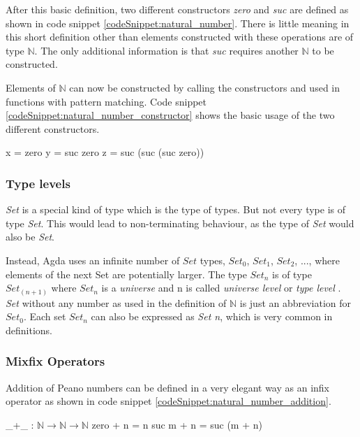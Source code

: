 After this basic definition, two different constructors \emph{zero} and \emph{suc} are defined as shown in code snippet \ref{codeSnippet:natural_number}.
There is little meaning in this short definition other than elements constructed with these operations are of type $\mathbb{N}$.
The only additional information is that \emph{suc} requires another $\mathbb{N}$ to be constructed.

Elements of $\mathbb{N}$ can now be constructed by calling the constructors and used in functions with pattern matching. 
Code snippet \ref{codeSnippet:natural_number_constructor} shows the basic usage of the two different constructors.

\begin{codesnippet}[mathescape=true, caption={Creating Peano numbers}, label={codeSnippet:natural_number_constructor}]
x = zero
y = suc zero
z = suc (suc (suc zero))
\end{codesnippet}

\subsubsection{Type levels}
\emph{Set} is a special kind of type which is the type of types.
But not every type is of type \emph{Set}. 
This would lead to non-terminating behaviour, as the type of \emph{Set} would also be \emph{Set}.

Instead, Agda uses an infinite number of $Set$ types, $Set_0$, $Set_1$, $Set_2$, ..., where elements of the next Set are potentially larger.
The type $Set_n$ is of type $Set_{(n+1)}$ where $Set_n$ is a \emph{universe} and n is called \emph{universe level} or \emph{type level} \cite{AgdaReadTheDocs, 10.1145/2841316}.
\emph{Set} without any number as used in the definition of $\mathbb{N}$ is just an abbreviation for $Set_0$. 
Each set $Set_n$ can also be expressed as \emph{Set n}, which is very common in definitions.

\subsubsection{Mixfix Operators}
Addition of Peano numbers can be defined in a very elegant way as an infix operator as shown in code snippet \ref{codeSnippet:natural_number_addition}.

\begin{codesnippet}[mathescape=true, caption={Addition function for Peano numbers}, label={codeSnippet:natural_number_addition}]
_+_ : $\mathbb{N} \rightarrow \mathbb{N} \rightarrow \mathbb{N}$
zero  + n = n
suc m + n = suc (m + n)
\end{codesnippet}

